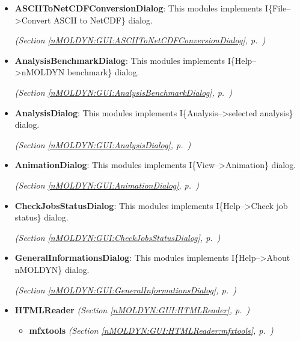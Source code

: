 \begin{itemize}
\setlength{\parskip}{0ex}
\item \textbf{ASCIIToNetCDFConversionDialog}: This modules implements I\{File--{\textgreater}Convert ASCII to NetCDF\} dialog.



  \textit{(Section \ref{nMOLDYN:GUI:ASCIIToNetCDFConversionDialog}, p.~\pageref{nMOLDYN:GUI:ASCIIToNetCDFConversionDialog})}

\item \textbf{AnalysisBenchmarkDialog}: This modules implements I\{Help--{\textgreater}nMOLDYN benchmark\} dialog.



  \textit{(Section \ref{nMOLDYN:GUI:AnalysisBenchmarkDialog}, p.~\pageref{nMOLDYN:GUI:AnalysisBenchmarkDialog})}

\item \textbf{AnalysisDialog}: This modules implements I\{Analysis--{\textgreater}selected analysis\} dialog.



  \textit{(Section \ref{nMOLDYN:GUI:AnalysisDialog}, p.~\pageref{nMOLDYN:GUI:AnalysisDialog})}

\item \textbf{AnimationDialog}: This modules implements I\{View--{\textgreater}Animation\} dialog.



  \textit{(Section \ref{nMOLDYN:GUI:AnimationDialog}, p.~\pageref{nMOLDYN:GUI:AnimationDialog})}

\item \textbf{CheckJobsStatusDialog}: This modules implements I\{Help--{\textgreater}Check job status\} dialog.



  \textit{(Section \ref{nMOLDYN:GUI:CheckJobsStatusDialog}, p.~\pageref{nMOLDYN:GUI:CheckJobsStatusDialog})}

\item \textbf{GeneralInformationsDialog}: This modules implements I\{Help--{\textgreater}About nMOLDYN\} dialog.



  \textit{(Section \ref{nMOLDYN:GUI:GeneralInformationsDialog}, p.~\pageref{nMOLDYN:GUI:GeneralInformationsDialog})}

\item \textbf{HTMLReader}
  \textit{(Section \ref{nMOLDYN:GUI:HTMLReader}, p.~\pageref{nMOLDYN:GUI:HTMLReader})}

  \begin{itemize}
\setlength{\parskip}{0ex}
    \item \textbf{mfxtools}
  \textit{(Section \ref{nMOLDYN:GUI:HTMLReader:mfxtools}, p.~\pageref{nMOLDYN:GUI:HTMLReader:mfxtools})}


\end{itemize}
\end{itemize}
